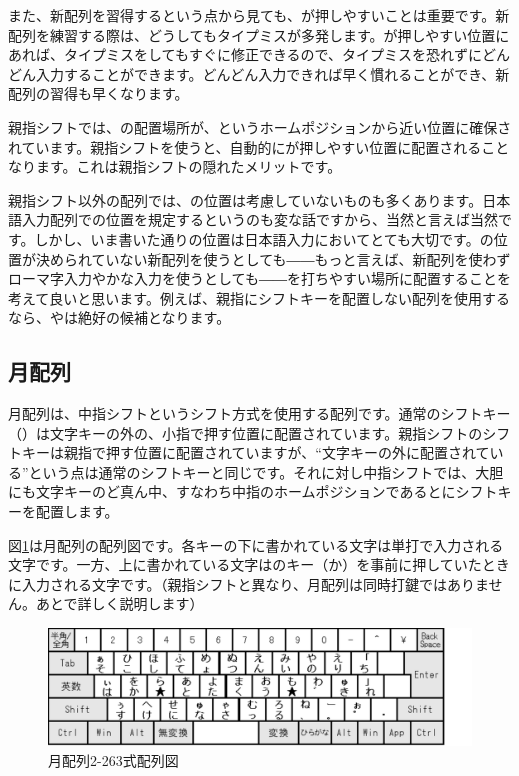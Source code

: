 また、新配列を習得するという点から見ても、が押しやすいことは重要です。新配列を練習する際は、どうしてもタイプミスが多発します。が押しやすい位置にあれば、タイプミスをしてもすぐに修正できるので、タイプミスを恐れずにどんどん入力することができます。どんどん入力できれば早く慣れることができ、新配列の習得も早くなります。

親指シフトでは、の配置場所が、\key{:}というホームポジションから近い位置に確保されています。親指シフトを使うと、自動的にが押しやすい位置に配置されることなります。これは親指シフトの隠れたメリットです。

親指シフト以外の配列では、の位置は考慮していないものも多くあります。日本語入力配列での位置を規定するというのも変な話ですから、当然と言えば当然です。しかし、いま書いた通りの位置は日本語入力においてとても大切です。の位置が決められていない新配列を使うとしても――もっと言えば、新配列を使わずローマ字入力やかな入力を使うとしても――を打ちやすい場所に配置することを考えて良いと思います。例えば、親指にシフトキーを配置しない配列を使用するなら、やは絶好の候補となります。

\subsection{月配列}

月配列は、中指シフトというシフト方式を使用する配列です。通常のシフトキー（）は文字キーの外の、小指で押す位置に配置されています。親指シフトのシフトキーは親指で押す位置に配置されていますが、“文字キーの外に配置されている”という点は通常のシフトキーと同じです。それに対し中指シフトでは、大胆にも文字キーのど真ん中、すなわち中指のホームポジションであるとにシフトキーを配置します。

図\ref{tuki2-263}は月配列の配列図です。各キーの下に書かれている文字は単打で入力される文字です。一方、上に書かれている文字はのキー（か）を事前に押していたときに入力される文字です。（親指シフトと異なり、月配列は同時打鍵ではありません。あとで詳しく説明します）


\begin{figure}
 \begin{center}
   \includegraphics[width=14cm,clip]{res_kouy/tuki2-263.eps}
 \end{center}
 \caption{月配列2-263式配列図}
 \label{tuki2-263}
\end{figure}

